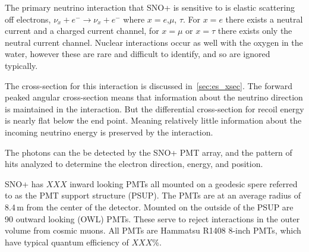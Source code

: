 The primary neutrino interaction that SNO+ is sensitive to is elastic scattering
off electrons,
$\nu_{x} + e^{-} \rightarrow \nu_{x} + e^{-}$
where $x=e$,$\mu$, $\tau$.
For $x=e$ there exists a neutral current and a charged current channel,
for $x=\mu$ or $x=\tau$ there exists only the neutral current channel.
Nuclear interactions occur as well with the oxygen in the water,
however these are rare and difficult to identify, and so are ignored typically.

The cross-section for this interaction is discussed in~\ref{sec:es_xsec}.
The forward peaked angular cross-section means that information about the
neutrino direction is maintained in the interaction.
But the differential cross-section for recoil energy is nearly flat below the
end point. Meaning relatively little information about the incoming neutrino energy
is preserved by the interaction.




The photons can the be detected by the SNO+ PMT array, and the pattern
of hits analyzed to determine the electron direction, energy, and position.

SNO+ has $XXX$ inward looking PMTs all mounted on a geodesic spere referred to as
the PMT support structure (PSUP). The PMTs are at an average radius of 8.4\,m from
the center of the detector.
Mounted on the outside of the PSUP are 90 outward looking (OWL) PMTs.
These serve to reject interactions in the outer volume from cosmic muons.
All PMTs are Hammatsu R1408 8-inch PMTs, which have typical quantum efficiency
of  $XXX$\%.

